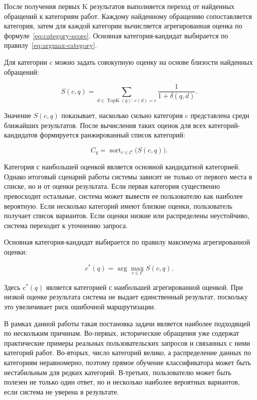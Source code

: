 \documentclass[14pt,a4paper]{extarticle}
\numberwithin{figure}{section}
\numberwithin{table}{section}
\begin{document}
После получения первых K результатов выполняется переход от найденных обращений к категориям работ. Каждому найденному обращению сопоставляется категория, затем для каждой категории вычисляется агрегированная оценка по формуле~\eqref{eq:category-score}. Основная категория-кандидат выбирается по правилу~\eqref{eq:argmax-category}.

Для категории c можно задать совокупную оценку на основе близости
найденных обращений:

\begin{equation}S(c,q)=\sum_{d\in\operatorname{TopK}(q):\,c(d)=c}\frac{1}{1+\delta(q,d)}.\label{eq:category-score}\end{equation}

Значение \(S(c,q)\) показывает, насколько сильно категория c
представлена среди ближайших результатов. После вычисления таких оценок
для всех категорий-кандидатов формируется ранжированный список
категорий:

\begin{equation}C_q=\operatorname{sort}_{c\in\mathcal{C}}\bigl(S(c,q)\bigr).\label{eq:category-ranking}\end{equation}

Категория с наибольшей оценкой является основной кандидатной категорией.
Однако итоговый сценарий работы системы зависит не только от первого
места в списке, но и от оценки результата. Если первая
категория существенно превосходит остальные, система может вывести ее
пользователю как наиболее вероятную. Если несколько категорий имеют
близкие оценки, пользователь получает список вариантов. Если оценки
низкие или распределены неустойчиво, система переходит к уточнению
запроса.

Основная категория-кандидат выбирается по правилу максимума агрегированной оценки:

\begin{equation}c^\ast(q)=\arg\max_{c\in\mathcal{C}} S(c,q).\label{eq:argmax-category}\end{equation}

Здесь \(c^\ast(q)\) является категорией с наибольшей агрегированной оценкой. При низкой оценке результата система не выдает единственный результат, поскольку это увеличивает риск ошибочной маршрутизации.

В рамках данной работы такая постановка задачи является наиболее
подходящей по нескольким причинам. Во-первых, исторические обращения уже
содержат практические примеры реальных пользовательских запросов и
связанных с ними категорий работ. Во-вторых, число категорий велико, а
распределение данных по категориям неравномерно, поэтому прямое обучение
классификатора может быть нестабильным для редких категорий. В-третьих,
пользователю может быть полезен не только один ответ, но и несколько
наиболее вероятных вариантов, если система не уверена в результате.
\end{document}
